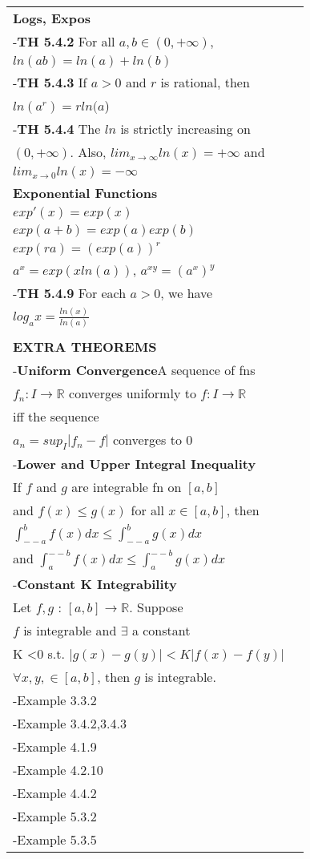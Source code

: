 \documentclass[10 pt,landscape]{article}
\begin{document}
\begin{multicols}{4}
\begin{tabular}{@{}ll@{}}
\end{tabular}

\begin{tabular}{@{}ll@{}}
\textbf{Logs, Expos}\\
-\textbf{TH 5.4.2} For all $a,b \in (0, +\infty)$,\\ $ln(ab)=ln(a) +ln(b)$\\
-\textbf{TH 5.4.3} If $a>0$ and $r$ is rational, then\\ $ln(a^r)=rln(a$)\\
-\textbf{TH 5.4.4} The $ln$ is strictly increasing on\\ $(0, +\infty)$. Also, $lim_{x \to \infty}ln(x)=+\infty$ and\\ $lim_{x \to 0}ln(x)=-\infty$\\
\textbf{Exponential Functions} \\$exp'(x)=exp(x)$\\$exp(a+b)=exp(a)exp(b)$\\$exp(ra)=(exp(a))^r$\\
$a^x=exp(xln(a))$, $a^{xy}=(a^x)^y$\\
-\textbf{TH 5.4.9} For each $a>0$, we have \\ $log_ax=\frac{ln(x)}{ln(a)}$
\\
\\
\textbf{EXTRA THEOREMS}\\
-\textbf{Uniform Convergence}A sequence of fns\\ $f_n:I \to \mathbb{R}$ converges uniformly to $f:I \to \mathbb{R}$\\ iff the sequence\\ $a_n=sup_I|f_n-f|$ converges to $0$\\
-\textbf{Lower and Upper Integral Inequality} \\If $f$ and $g$ are integrable fn on $[a,b]$\\ and $f(x) \leq g(x)$ for all $x \in [a,b]$, then\\ $\int_{--a}^{b}f(x)dx \leq \int_{--a}^{b}g(x)dx$\\ and $\int_{a}^{--b}f(x)dx \leq \int_{a}^{--b}g(x)dx$\\
-\textbf{Constant K Integrability}\\Let $f,g$ : $[a,b] \to \mathbb{R}$.  Suppose\\ $f$ is integrable and $\exists$ a constant \\K \textless  0 s.t. $|g(x)-g(y)|< K|f(x)-f(y)|$\\ $\forall x,y,\in [a,b]$, then $g$ is integrable.
\\-Example 3.3.2\\
-Example 3.4.2,3.4.3\\
-Example 4.1.9\\
-Example 4.2.10\\
-Example 4.4.2\\
-Example 5.3.2\\
-Example 5.3.5\\

\end{tabular} 







\end{multicols}
\end{document}
